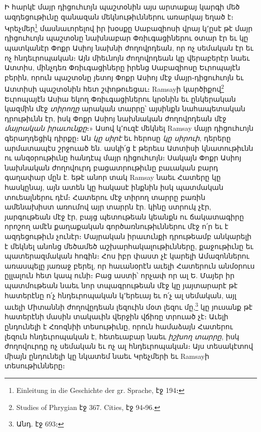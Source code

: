 \documentclass{article}
\begin{document}
{Ի հարկէ մայր դիցուհւոյն պաշտօնին այս արտաքայ կարգի մեծ ազդեցութիւնը զանազան մեկնութիւններու առարկայ եղած է։ Կրեչմեր\footnote{Einleitung in die Geschichte der gr. Sprache, էջ 194։} մասնաւորելով իր խօսքը Սաբազիոսի վրայ կ՚ըսէ թէ մայր դիցուհւոյն պաշտօնը նախնաբար Փռիւգացիներու օտար էր եւ կը պատկանէր Փոքր Ասիոյ նախնի ժողովրդեան, որ ոչ սեմական էր եւ ոչ հնդեւրոպական։ Այն միեւնոյն ժողովրդեան կը վերաբերէր նաեւ Ատտիս, մինչդեռ Փռիւգացիները իրենց Սաբազիոսը Եւրոպայէն բերին, որուն պաշտօնը յետոյ Փոքր Ասիոյ մէջ մայր֊դիցուհւոյն եւ Ատտիսի պաշտօնին հետ շփոթուեցաւ։ Ramsayի կարծիքով\footnote{Studies of Phrygian էջ 367. Cities, էջ 94֊96.} Եւրոպայէն Ասիա եկող Փռիւգացիներու կրօնին եւ ընկերական կազմին մէջ \emph{տիրողը} արական տարրը՝ այսինքն նահապետական դրութիւնն էր, իսկ Փոքր Ասիոյ նախնական ժողովրդեան մէջ \emph{մայրական իրաւունքը}։» Ասով կ՚ուզէ մեկնել Ramsay մայր դիցուհւոյն գերաղդեցիկ դիրքը։ Ան \emph{կը սիրէ} եւ հերոսը \emph{կը սիրուի}, դերերը արմատապէս շրջուած են. ասկի՛ց է թերեւս Ատտիսի կնատութիւնն ու անզօրութիւնը հանդէպ մայր դիցուհւոյն։ Սակայն Փոքր Ասիոյ նախնական ժողովուրդ բացատրութիւնը բաւական բարդ գաղափար մըն է. եթէ անոր տակ Ramsay նաեւ Հատերը կը հասկընայ, այն ատեն կը հակասէ ինքնին իսկ պատմական տուեալներու դէմ։ Հատերու մէջ տիրող տարրը բառին ամենախիստ առումով այր տարրն էր. կինը ստրուկ չէր, յարգութեան մէջ էր, բայց պետութեան կեանքն ու ճակատագիրը որոշող ամէն քաղաքական գործառնութիւններու մէջ ո՛ր եւ է ազդեցութիւն չունէր։ Մայրական իրաւունքի դրութեամբ անկարելի է մեկնել անոնց մեծամեծ աշխարհակալութիւնները, քաջութիւնը եւ պատերազմական հոգին։ Հոս իբր փաստ չէ կարելի Ամազոններու առասպելը յառաջ բերել, որ հաւանօրէն աւելի Հատերուն անմօրուս ըլլալուն հետ կապ ունի։ Բաց աստի՝ որչափ որ ալ Ե. Մայեր իր պատմութեան նաեւ նոր տպագրութեան մէջ կը յայտարարէ թէ հատերէնը ո՛չ հնդեւրոպական կ՚երեւայ եւ ո՛չ ալ սեմական, այլ աւելի Միտաննի ժողովըդեան լեզուին մօտ լեզու մը,\footnote{Անդ. էջ 693։} կը յուսանք թէ հատերէնի մասին տակաւին վերջին վճիռը տրուած չէ։ Աւելի ընդունելի է Հռոզնիի տեսութիւնը, որուն համաձայն Հատերու լեզուն հնդեւրոպական է, հետեւաբար նաեւ \emph{իշխող տարրը}, իսկ ժողովուրդը ոչ սեմական եւ ոչ ալ հնդեւրոպական։ Այս տեսակէտով միայն ընդունելի կը նկատեմ նաեւ Կրեչմերի եւ Ramsayի տեսութիւնները։

}
\end{document}
